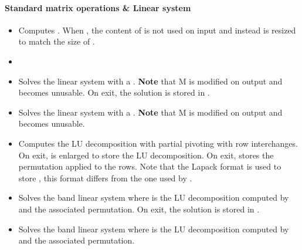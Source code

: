 \paragraph{Standard matrix operations \& Linear system}
\begin{itemize}
\item {} 
  \sshortdescribe Computes . When , the
  content of  is not used on input and instead  is resized to
  match the size of .
\item {}
  \sshortdescribe {}
\item 
    \sshortdescribe Solves the linear system  with  a .
  {\bf Note} that M is modified on output and becomes unusable. On exit, the
  solution  is stored in .
\item 
    \sshortdescribe Solves the linear system  with  a .
  {\bf Note} that M is modified on output and becomes unusable. 
\item {}
  \sshortdescribe Computes the LU decomposition with partial pivoting with row
  interchanges. On exit,  is enlarged to store the LU decomposition. On
  exit,  stores the permutation applied to the rows. Note that the Lapack format
  is used to store , this format differs from the one used by
  .
\item  {} 
  \sshortdescribe Solves the band linear system  where  is
  the LU decomposition computed by   and  the
  associated permutation. On exit, the solution  is stored in .
\item  {} 
  \sshortdescribe Solves the band linear system  where  is the LU
  decomposition computed by  and  the associated permutation. 
\end{itemize}

